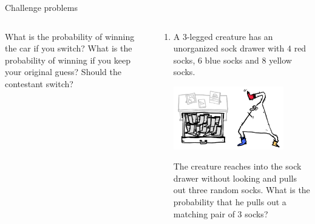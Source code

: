 \documentclass[9pt,aspectratio=169]{beamer}
\begin{document}
\begin{frame}{Challenge problems}
\begin{columns}[T]
\begin{column}{0.5\textwidth}
{\begin{enumerate}
        What is the probability of winning the car if you switch? 
        What is the probability of winning if you keep your original guess? Should the contestant switch?
        \seti
      \end{enumerate}
      }
    \end{column}
    \begin{column}{0.5\textwidth}
      \begin{enumerate}
        \conti
        \item A 3-legged creature has an unorganized sock drawer with $4$ red socks, $6$ blue socks and $8$ yellow socks.
        \begin{center}
          \vspace*{-1ex}   
          \includegraphics[width = 0.80\textwidth]{03 - Probability/3-leg-creature.png}
          \vspace*{-1ex}   
        \end{center} 
        The creature reaches into the sock drawer without looking and pulls out three random socks.  What is the probability that he pulls out a matching pair of $3$ socks?
      \end{enumerate}
    \end{column}
  \end{columns}
\end{frame}

        
\end{document}
